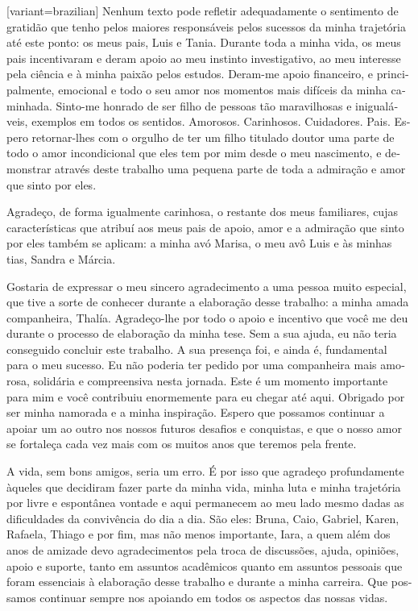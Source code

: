 \documentclass[12pt, twoside]{report}
\begin{document}
\begin{portuguese}[variant=brazilian]
  Nenhum texto pode refletir adequadamente o sentimento de gratidão que tenho pelos maiores responsáveis pelos sucessos da minha trajetória até este ponto: os meus pais, Luis e Tania. Durante toda a minha vida, os meus pais incentivaram e deram apoio ao meu instinto investigativo, ao meu interesse pela ciência e à minha paixão pelos estudos. Deram-me apoio financeiro, e principalmente, emocional e todo o seu amor nos momentos mais difíceis da minha caminhada. Sinto-me honrado de ser filho de pessoas tão maravilhosas e inigualáveis, exemplos em todos os sentidos. Amorosos. Carinhosos. Cuidadores. Pais. Espero retornar-lhes com o orgulho de ter um filho titulado doutor uma parte de todo o amor incondicional que eles tem por mim desde o meu nascimento, e demonstrar através deste trabalho uma pequena parte de toda a admiração e amor que sinto por eles.

  Agradeço, de forma igualmente carinhosa, o restante dos meus familiares, cujas características que atribuí aos meus pais de apoio, amor e a admiração que sinto por eles também se aplicam: a minha avó Marisa, o meu avô Luis e às minhas tias, Sandra e Márcia.

  Gostaria de expressar o meu sincero agradecimento a uma pessoa muito especial, que tive a sorte de conhecer durante a elaboração desse trabalho: a minha amada companheira, Thalía. Agradeço-lhe por todo o apoio e incentivo que você me deu durante o processo de elaboração da minha tese. Sem a sua ajuda, eu não teria conseguido concluir este trabalho. A sua presença foi, e ainda é, fundamental para o meu sucesso. Eu não poderia ter pedido por uma companheira mais amorosa, solidária e compreensiva nesta jornada. Este é um momento importante para mim e você contribuiu enormemente para eu chegar até aqui. Obrigado por ser minha namorada e a minha inspiração. Espero que possamos continuar a apoiar um ao outro nos nossos futuros desafios e conquistas, e que o nosso amor se fortaleça cada vez mais com os muitos anos que teremos pela frente.

  A vida, sem bons amigos, seria um erro. É por isso que agradeço profundamente àqueles que decidiram fazer parte da minha vida, minha luta e minha trajetória por livre e espontânea vontade e aqui permanecem ao meu lado mesmo dadas as dificuldades da convivência do dia a dia. São eles: Bruna, Caio, Gabriel, Karen, Rafaela, Thiago e por fim, mas não menos importante, Iara, a quem além dos anos de amizade devo agradecimentos pela troca de discussões, ajuda, opiniões, apoio e suporte, tanto em assuntos acadêmicos quanto em assuntos pessoais que foram essenciais à elaboração desse trabalho e durante a minha carreira. Que possamos continuar sempre nos apoiando em todos os aspectos das nossas vidas.


\end{portuguese}
\end{document}
